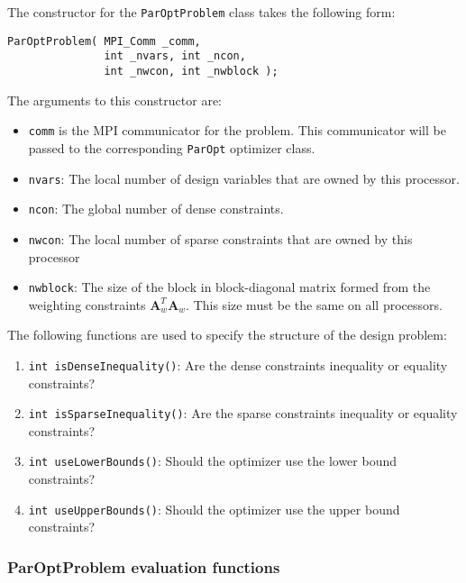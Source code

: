 \documentclass[12pt]{article}
\newcommand{\mb}{\mathbf}
\begin{document}
The constructor for the \texttt{ParOptProblem} class takes the following form:
%
\begin{verbatim}
ParOptProblem( MPI_Comm _comm,
               int _nvars, int _ncon,
               int _nwcon, int _nwblock );
\end{verbatim}

The arguments to this constructor are:
\begin{itemize}
\item \texttt{comm} is the MPI communicator for the problem. 
This communicator will be passed to the corresponding \texttt{ParOpt} optimizer class.

\item \texttt{nvars}: The local number of design variables that are owned by this processor.

\item \texttt{ncon}: The global number of dense constraints.

\item \texttt{nwcon}: The local number of sparse constraints that are owned by this processor

\item \texttt{nwblock}: The size of the block in block-diagonal matrix formed from the weighting constraints $\mb{A}_{w}^{T}\mb{A}_{w}$. This size must be the same on all processors.
\end{itemize}

The following functions are used to specify the structure of the design problem:
\begin{enumerate}
\item \texttt{int isDenseInequality()}: Are the dense constraints inequality or equality constraints?
\item \texttt{int isSparseInequality()}: Are the sparse constraints inequality or equality constraints?
\item \texttt{int useLowerBounds()}: Should the optimizer use the lower bound constraints?
\item \texttt{int useUpperBounds()}: Should the optimizer use the upper bound constraints?
\end{enumerate}

\subsubsection{ParOptProblem evaluation functions}
\end{document}
